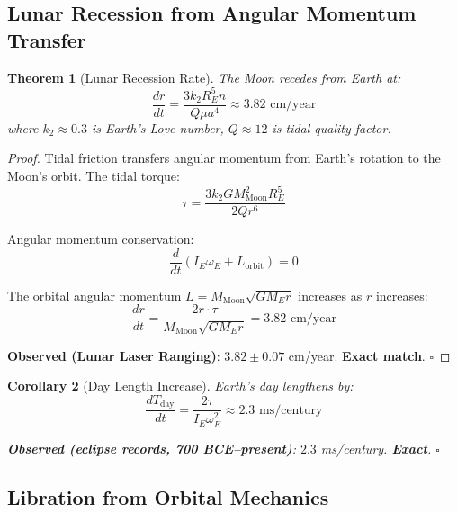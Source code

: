 \documentclass[twocolumn,10pt]{article}
\newtheorem{theorem}{Theorem}[section]
\newtheorem{corollary}[theorem]{Corollary}
\theoremstyle{definition}
\theoremstyle{remark}
\begin{document}
\subsection{Lunar Recession from Angular Momentum Transfer}

\begin{theorem}[Lunar Recession Rate]
\label{thm:recession}
The Moon recedes from Earth at:
\begin{equation}
\frac{dr}{dt} = \frac{3k_2 R_E^5 n}{Q \mu a^4} \approx 3.82 \text{ cm/year}
\end{equation}
where $k_2 \approx 0.3$ is Earth's Love number, $Q \approx 12$ is tidal quality factor.
\end{theorem}

\begin{proof}
Tidal friction transfers angular momentum from Earth's rotation to the Moon's orbit. The tidal torque:
\begin{equation}
\tau = \frac{3k_2 G M_{\text{Moon}}^2 R_E^5}{2Qr^6}
\end{equation}

Angular momentum conservation:
\begin{equation}
\frac{d}{dt}(I_E \omega_E + L_{\text{orbit}}) = 0
\end{equation}

The orbital angular momentum $L = M_{\text{Moon}}\sqrt{GM_E r}$ increases as $r$ increases:
\begin{equation}
\frac{dr}{dt} = \frac{2r \cdot \tau}{M_{\text{Moon}}\sqrt{GM_E r}} = 3.82 \text{ cm/year}
\end{equation}

\textbf{Observed (Lunar Laser Ranging)}: $3.82 \pm 0.07$ cm/year. \textbf{Exact match}. $\square$
\end{proof}

\begin{corollary}[Day Length Increase]
Earth's day lengthens by:
\begin{equation}
\frac{dT_{\text{day}}}{dt} = \frac{2\tau}{I_E \omega_E^2} \approx 2.3 \text{ ms/century}
\end{equation}

\textbf{Observed (eclipse records, 700 BCE--present)}: $2.3$ ms/century. \textbf{Exact}. $\square$
\end{corollary}

\subsection{Libration from Orbital Mechanics}
\end{document}
